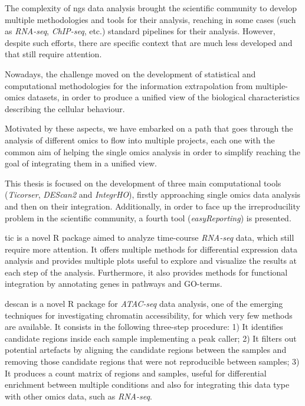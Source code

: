 The complexity of \gls{ngs} data analysis brought the scientific community to develop multiple methodologies and tools for their analysis, reaching in some cases (such as \textit{RNA-seq}, \textit{ChIP-seq}, etc.) standard pipelines for their analysis.
However, despite such efforts, there are specific context that are much less developed and that still require attention.

Nowadays, the challenge moved on the development of statistical and computational methodologies for the information extrapolation from multiple-omics datasets, in order to produce a unified view of the biological characteristics describing the cellular behaviour.

Motivated by these aspects, we have embarked on a path that goes through the analysis of different omics to flow into multiple projects, each one with the common aim of helping the single omics analysis in order to simplify reaching the goal of integrating them in a unified view.

This thesis is focused on the development of three main computational tools (\textit{Ticorser}, \textit{DEScan2} and \textit{IntegrHO}), firstly approaching single omics data analysis and then on their integration.
Additionally, in order to face up the irreproducility problem in the scientific community, a fourth tool (\textit{easyReporting}) is presented.

\gls{tic} is a novel R package aimed to analyze time-course \textit{RNA-seq} data, which still require more attention. It offers multiple methods for differential expression data analysis and provides multiple plots useful to explore and visualize the results at each step of the analysis. Furthermore, it also provides methods for functional integration by annotating genes in pathways and GO-terms.

\gls{descan} is a novel R package for \textit{ATAC-seq} data analysis, one of the emerging techniques for investigating chromatin accessibility, for which very few methods are available. It consists in the following three-step procedure: 1) It identifies candidate regions inside each sample implementing a peak caller; 2) It filters out potential artefacts by aligning the candidate regions between the samples and removing those candidate regions that were not reproducible between samples; 3) It produces a count matrix of regions and samples, useful for differential enrichment between multiple conditions and also for integrating this data type with other omics data, such as \textit{RNA-seq}.

